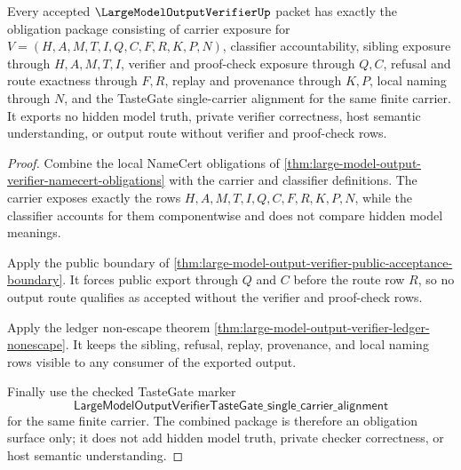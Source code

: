 \begin{theorem}
\label{thm:large-model-output-verifier-obligation-closure-package}
Every accepted $\LargeModelOutputVerifierUp$ packet has exactly the obligation package consisting of carrier exposure for $V=(H,A,M,T,I,Q,C,F,R,K,P,N)$, classifier accountability, sibling exposure through $H,A,M,T,I$, verifier and proof-check exposure through $Q,C$, refusal and route exactness through $F,R$, replay and provenance through $K,P$, local naming through $N$, and the TasteGate single-carrier alignment for the same finite carrier. It exports no hidden model truth, private verifier correctness, host semantic understanding, or output route without verifier and proof-check rows.
\end{theorem}
\begin{proof}
Combine the local NameCert obligations of \autoref{thm:large-model-output-verifier-namecert-obligations} with the carrier and classifier definitions. The carrier exposes exactly the rows $H,A,M,T,I,Q,C,F,R,K,P,N$, while the classifier accounts for them componentwise and does not compare hidden model meanings.

Apply the public boundary of \autoref{thm:large-model-output-verifier-public-acceptance-boundary}. It forces public export through $Q$ and $C$ before the route row $R$, so no output route qualifies as accepted without the verifier and proof-check rows.

Apply the ledger non-escape theorem \autoref{thm:large-model-output-verifier-ledger-nonescape}. It keeps the sibling, refusal, replay, provenance, and local naming rows visible to any consumer of the exported output.

Finally use the checked TasteGate marker
$$
\mathsf{LargeModelOutputVerifierTasteGate\_single\_carrier\_alignment}
$$
for the same finite carrier. The combined package is therefore an obligation surface only; it does not add hidden model truth, private checker correctness, or host semantic understanding.
\end{proof}



